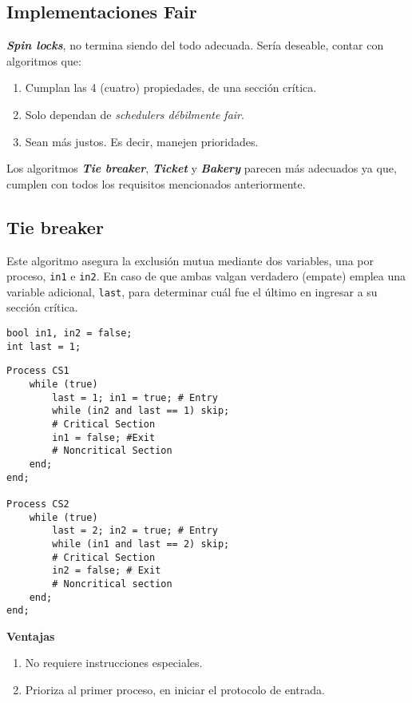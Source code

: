 \documentclass[a4paper, 10pt]{report}
\begin{document}
\subsection{Implementaciones Fair}
\textbf{\emph{Spin locks}}, no termina siendo del todo adecuada. Sería deseable, contar con algoritmos que:
\begin{enumerate}
	\item Cumplan las 4 (cuatro) propiedades, de una sección crítica.
	\item Solo dependan de \emph{schedulers débilmente fair}.
	\item Sean más justos. Es decir, manejen prioridades.
\end{enumerate}

Los algoritmos \textbf{\emph{Tie breaker}}, \textbf{\emph{Ticket}} y \textbf{\emph{Bakery}} parecen más adecuados ya que, cumplen con todos los requisitos mencionados anteriormente.

\subsection{Tie breaker}

Este algoritmo asegura la exclusión mutua mediante dos variables, una por proceso, \lstinline{in1} e \lstinline{in2}. En caso de que ambas valgan verdadero (empate) emplea una variable adicional, \lstinline{last}, para determinar cuál fue el último en ingresar a su sección crítica.

\begin{lstlisting}
bool in1, in2 = false;
int last = 1;
\end{lstlisting}
\begin{lstlisting}[multicols=2, firstnumber=3]
Process CS1
	while (true)
		last = 1; in1 = true; # Entry
		while (in2 and last == 1) skip;
		# Critical Section
		in1 = false; #Exit
		# Noncritical Section
	end;
end;
	
Process CS2
	while (true)
		last = 2; in2 = true; # Entry
		while (in1 and last == 2) skip;
		# Critical Section
		in2 = false; # Exit
		# Noncritical section
	end;
end;
\end{lstlisting}

\textbf{Ventajas}
\begin{enumerate}
	\item No requiere instrucciones especiales.
	\item Prioriza al primer proceso, en iniciar el protocolo de entrada.
\end{enumerate}
\end{document}
